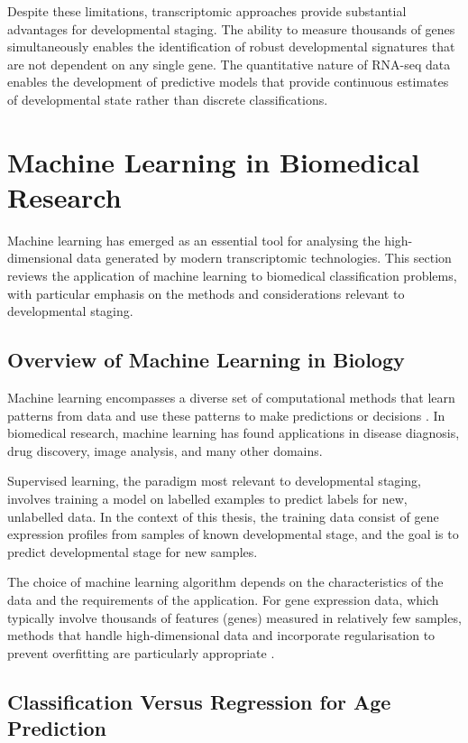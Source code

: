 Despite these limitations, transcriptomic approaches provide substantial advantages for developmental staging. The ability to measure thousands of genes simultaneously enables the identification of robust developmental signatures that are not dependent on any single gene. The quantitative nature of RNA-seq data enables the development of predictive models that provide continuous estimates of developmental state rather than discrete classifications.


\section{Machine Learning in Biomedical Research}\label{sec:lit:ml}

Machine learning has emerged as an essential tool for analysing the high-dimensional data generated by modern transcriptomic technologies. This section reviews the application of machine learning to biomedical classification problems, with particular emphasis on the methods and considerations relevant to developmental staging.

\subsection{Overview of Machine Learning in Biology}

Machine learning encompasses a diverse set of computational methods that learn patterns from data and use these patterns to make predictions or decisions \parencite{greener_guide_2022}. In biomedical research, machine learning has found applications in disease diagnosis, drug discovery, image analysis, and many other domains.

Supervised learning, the paradigm most relevant to developmental staging, involves training a model on labelled examples to predict labels for new, unlabelled data. In the context of this thesis, the training data consist of gene expression profiles from samples of known developmental stage, and the goal is to predict developmental stage for new samples.

The choice of machine learning algorithm depends on the characteristics of the data and the requirements of the application. For gene expression data, which typically involve thousands of features (genes) measured in relatively few samples, methods that handle high-dimensional data and incorporate regularisation to prevent overfitting are particularly appropriate \parencite{greener_guide_2022}.

\subsection{Classification Versus Regression for Age Prediction}

